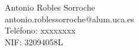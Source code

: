 Antonio Robles Sorroche \\ %
antonio.roblessorroche@alum.uca.es \\ %
Teléfono: xxxxxxxx \\ %
NIF: 32094058L \\ %
